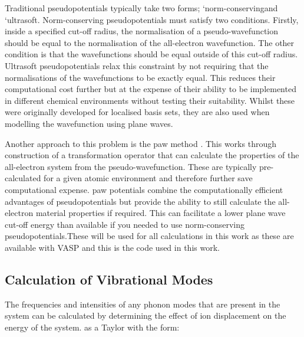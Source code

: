 Traditional pseudopotentials typically take two forms; `norm\nobreakdash-conserving\DIFdelbegin {}\DIFdelend \DIFaddbegin {}\DIFaddend and `ultrasoft\DIFdelbegin {}\DIFdelend \DIFaddbegin {}\DIFaddend . Norm\nobreakdash-conserving pseudopotentials \DIFdelbegin \DIFdel{~}\DIFdelend \cite{Hamann1979} must satisfy two conditions. Firstly, inside a specified cut\nobreakdash-off radius, the normalisation of a pseudo\nobreakdash-wavefunction should be equal to the normalisation of the all\nobreakdash-electron wavefunction. The other condition is that the wavefunctions should be equal outside of this cut\nobreakdash-off radius. Ultrasoft pseudopotentials \DIFdelbegin \DIFdel{~}\DIFdelend \cite{Vanderbilt1990} relax this constraint by not requiring that the normalisations of the wavefunctions to be exactly equal. This reduces their computational cost further but at the expense of their ability to be implemented in different chemical environments without testing their suitability. Whilst these were originally developed for localised basis sets, they are also used when modelling the wavefunction using plane waves.

Another approach to this problem is the \acrfull{paw} method \DIFdelbegin \DIFdel{~}\DIFdelend \cite{Blochl1994}. This works through construction of a transformation operator that can calculate the properties of the all\nobreakdash-electron system from the pseudo\nobreakdash-wavefunction. These are typically pre\nobreakdash-calculated for a given atomic environment and therefore further save computational expense. \acrshort{paw} potentials combine the computationally efficient advantages of pseudopotentials but provide the ability to still calculate the all\nobreakdash-electron material properties if required. This can facilitate a lower plane wave cut\nobreakdash-off energy than available if you needed to use norm\nobreakdash-conserving pseudopotentials.\DIFaddbegin {}\DIFaddend These will be used for all calculations in this work as these are available with VASP \DIFdelbegin \DIFdel{~}\DIFdelend \cite{Hafner2008} and this is the code used in this work.

\subsection{Calculation of Vibrational Modes}
\label{subsec:vibmodestheory}
The frequencies and intensities of any phonon modes that are present in the system can be calculated by determining the effect of ion displacement on the energy of the system. \DIFdelbegin {}\DIFdelend \DIFaddbegin {}\DIFaddend as a Taylor \DIFdelbegin {}\DIFdelend \DIFaddbegin {}\DIFaddend with the form:

